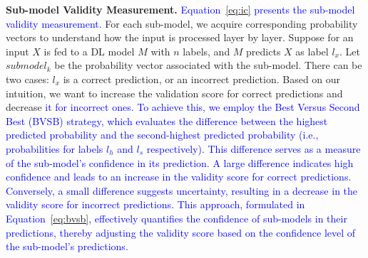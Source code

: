





\textbf{Sub-model Validity Measurement.}
\textcolor{blue}{Equation~\ref{eq:ic} presents the sub-model validity measurement.} For each sub-model, we acquire corresponding probability vectors to understand how the input is processed layer by layer. Suppose for an input $X$ is fed to a DL model $M$ with $n$ labels, and $M$ predicts $X$ as label $l_x$. Let $submodel_k$ be the probability vector associated with the sub-model. There can be two cases: $l_x$ is %
 a correct prediction, or an incorrect prediction. Based on our intuition, we want to increase the validation score for correct predictions and decrease \textcolor{blue}{it for incorrect ones. To achieve this, we employ the Best Versus Second Best (BVSB) strategy, which evaluates the difference between the highest predicted probability and the second-highest predicted probability (i.e., probabilities for labels $l_h$ and $l_s$ respectively). This difference serves as a measure of the sub-model's confidence in its prediction. A large difference indicates high confidence and leads to an increase in the validity score for correct predictions. Conversely, a small difference suggests uncertainty, resulting in a decrease in the validity score for incorrect predictions. This approach, formulated in Equation~\ref{eq:bvsb}, effectively quantifies the confidence of sub-models in their predictions, thereby adjusting the validity score based on the confidence level of the sub-model's predictions.} 


